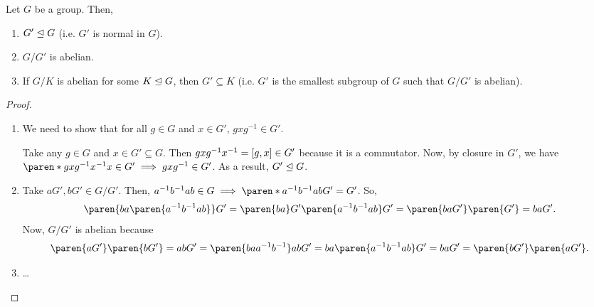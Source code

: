 \documentclass[11pt]{penrose}
\begin{document}
\begin{nthm}
    Let $G$ be a group. Then,
    \begin{enumerate}
        \item $G' \mathrel{\trianglelefteq} G$ (i.e. $G'$ is normal in $G$).
        \item $G / G'$ is abelian.
        \item If $G / K$ is abelian for some $K \mathrel{\trianglelefteq} G$, then $G' \subseteq K$ (i.e. $G'$ is the smallest subgroup of $G$ such that $G/G'$ is abelian).
    \end{enumerate}
\end{nthm}
\begin{proof}
    \phantom{}
    \begin{enumerate}
        \item We need to show that for all $g \in G$ and $x \in G'$, $g x g^{-1} \in G'$.

        Take any $g \in G$ and $x \in G' \subseteq G$. Then $g x g^{-1} x^{-1} = \lbrack g, x\rbrack \in G'$ because it is a commutator. Now, by closure in $G'$, we have
        $\paren*{ g x g^{-1} x^{-1} } x \in G' \implies g x g^{-1} \in G'$. As a result, $G' \mathrel{\trianglelefteq} G$.

        \item Take $aG', bG' \in G/G'$. Then, $a^{-1}b^{-1}ab \in G \implies \paren*{a^{-1}b^{-1}ab} G' = G'$. So,
        \begin{equation*}
            \paren{ba\paren{a^{-1}b^{-1}ab}} G' = \paren{ba} G' \paren{a^{-1}b^{-1}ab} G' = \paren{ba G'} \paren{G'} = ba G'.
        \end{equation*}
        Now, $G/G'$ is abelian because
        \begin{equation*}
            \paren{aG'} \paren{bG'} = ab G' = \paren{baa^{-1}b^{-1}}ab G' = ba\paren{a^{-1}b^{-1}ab} G' = ba G' = \paren{bG'} \paren{aG'}.
        \end{equation*}

        \item \dots
    \end{enumerate}
\end{proof}
\end{document}
